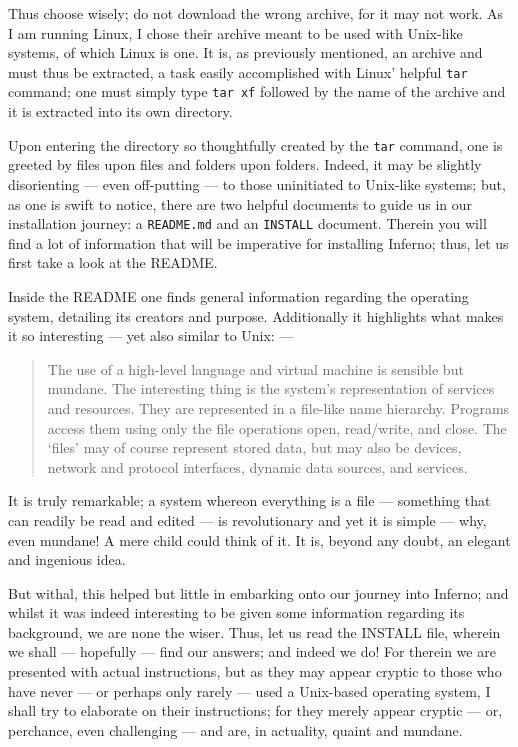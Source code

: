\documentclass[a5paper,twoside,12pt]{report}
\begin{document}
Thus choose wisely; do not download the wrong archive, for it may not work. As I am running Linux, I chose their archive meant to be used with Unix-like systems, of which Linux is one. It is, as previously mentioned, an archive and must thus be extracted, a task easily accomplished with Linux' helpful \texttt{tar} command; one must simply type \texttt{tar xf} followed by the name of the archive and it is extracted into its own directory.

Upon entering the directory so thoughtfully created by the \texttt{tar} command, one is greeted by files upon files and folders upon folders. Indeed, it may be slightly disorienting — even off-putting — to those uninitiated to Unix-like systems; but, as one is swift to notice, there are two helpful documents to guide us in our installation journey: a \texttt{README.md} and an \texttt{INSTALL} document. Therein you will find a lot of information that will be imperative for installing Inferno; thus, let us first take a look at the README.

Inside the README one finds general information regarding the operating system, detailing its creators and purpose. Additionally it highlights what makes it so interesting — yet also similar to Unix: —

\begin{quote}
  The use of a high-level language and virtual machine is sensible but mundane. The interesting thing is the
  system’s representation of services and resources. They are represented in a file-like name hierarchy.
  Programs access them using only the file operations open, read/write, and close. The ‘files’ may of course
  represent stored data, but may also be devices, network and protocol interfaces, dynamic data sources, and
  services.
\end{quote}

It is truly remarkable; a system whereon everything is a file — something that can readily be read and edited — is revolutionary and yet it is simple — why, even mundane! A mere child could think of it. It is, beyond any doubt, an elegant and ingenious idea.

But withal, this helped but little in embarking onto our journey into Inferno; and whilst it was indeed interesting to be given some information regarding its background, we are none the wiser. Thus, let us read the INSTALL file, wherein we shall — hopefully — find our answers; and indeed we do!
For therein we are presented with actual instructions, but as they may appear cryptic to those who have never — or perhaps only rarely — used a Unix-based operating system, I shall try to elaborate on their instructions; for they merely appear cryptic — or, perchance, even challenging — and are, in actuality, quaint and mundane.
\end{document}
